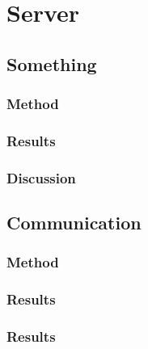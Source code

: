 \section{Server}
    \subsection{Something}
        \subsubsection{Method}
        \subsubsection{Results}
        \subsubsection{Discussion}
    \subsection{Communication}
        \subsubsection{Method}
        \subsubsection{Results}
        \subsubsection{Results}